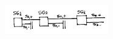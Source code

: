 \documentclass[10pt,oneside]{CBFT_book}
\begin{document}
\begin{figure}[htb]
	\begin{center}
	\includegraphics[width=0.4\textwidth]{images/teo2_4.pdf}	 
	\end{center}
	\caption{}
\end{figure} 



\end{document}
